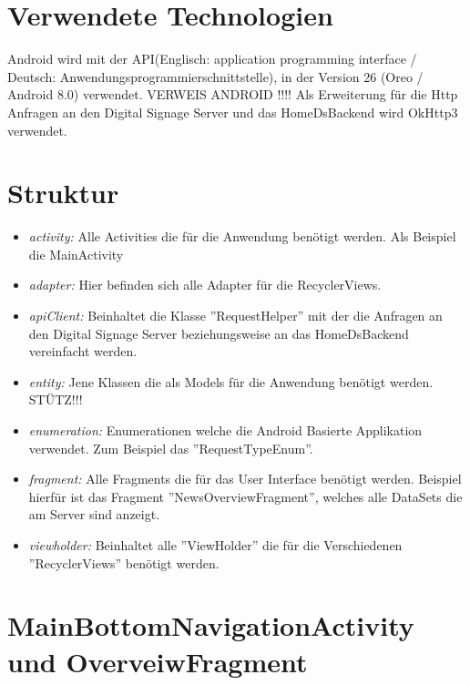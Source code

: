 \section{Verwendete Technologien}
Android wird mit der API(Englisch: application programming interface / Deutsch: Anwendungsprogrammierschnittstelle), in der Version 26 (Oreo / Android 8.0) verwendet. 
VERWEIS ANDROID !!!!
Als Erweiterung für die Http Anfragen an den Digital Signage Server und das HomeDsBackend wird OkHttp3 verwendet.
\section{Struktur}
\begin{itemize}
	\item {\em activity:} Alle Activities die für die Anwendung benötigt werden. Als Beispiel die MainActivity
	
	\item {\em adapter:} Hier befinden sich alle Adapter für die RecyclerViews.
	
	\item {\em apiClient:} Beinhaltet die Klasse ''RequestHelper'' mit der die Anfragen an den Digital Signage Server beziehungsweise an das HomeDsBackend vereinfacht werden.
	
	\item {\em entity:} Jene Klassen die als Models für die Anwendung benötigt werden. 
	STÜTZ!!!
	
	\item {\em enumeration:} Enumerationen welche die Android Basierte Applikation verwendet. Zum Beispiel das ''RequestTypeEnum''.
	
	\item {\em fragment:} Alle Fragments die für das User Interface benötigt werden. Beispiel hierfür ist das Fragment ''NewsOverviewFragment'', welches alle DataSets die am Server sind anzeigt.
	
	\item {\em viewholder:} Beinhaltet alle ''ViewHolder'' die für die Verschiedenen ''RecyclerViews'' benötigt werden. 		
\end{itemize}
\section{MainBottomNavigationActivity und OverveiwFragment}
